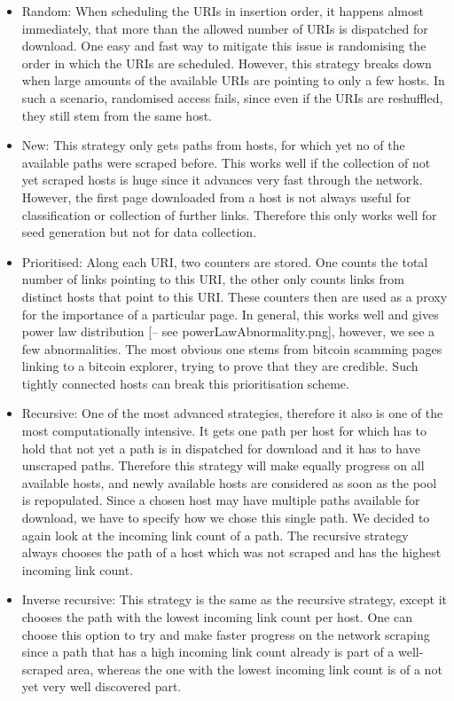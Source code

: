 \documentclass[USenglish,oneside,twocolumn]{article}
\begin{document}
\begin{itemize}
  \item Random: When scheduling the URIs in insertion order, it happens almost immediately, that more than the allowed number of URIs is dispatched for download. One easy and fast way to mitigate this issue is randomising the order in which the URIs are scheduled. However, this strategy breaks down when large amounts of the available URIs are pointing to only a few hosts. In such a scenario, randomised access fails, since even if the URIs are reshuffled, they still stem from the same host.
  \item New: This strategy only gets paths from hosts, for which yet no of the available paths were scraped before. This works well if the collection of not yet scraped hosts is huge since it advances very fast through the network. However, the first page downloaded from a host is not always useful for classification or collection of further links. Therefore this only works well for seed generation but not for data collection.
  \item Prioritised: Along each URI, two counters are stored. One counts the total number of links pointing to this URI, the other only counts links from distinct hosts that point to this URI. These counters then are used as a proxy for the importance of a particular page. In general, this works well and gives power law distribution [-- see powerLawAbnormality.png], however, we see a few abnormalities. The most obvious one stems from bitcoin scamming pages linking to a bitcoin explorer, trying to prove that they are credible. Such tightly connected hosts can break this prioritisation scheme.
  \item Recursive: One of the most advanced strategies, therefore it also is one of the most computationally intensive. It gets one path per host for which has to hold that not yet a path is in dispatched for download and it has to have unscraped paths. Therefore this strategy will make equally progress on all available hosts, and newly available hosts are considered as soon as the pool is repopulated. Since a chosen host may have multiple paths available for download, we have to specify how we chose this single path. We decided to again look at the incoming link count of a path. The recursive strategy always chooses the path of a host which was not scraped and has the highest incoming link count.
  \item Inverse recursive: This strategy is the same as the recursive strategy, except it chooses the path with the lowest incoming link count per host. One can choose this option to try and make faster progress on the network scraping since a path that has a high incoming link count already is part of a well-scraped area, whereas the one with the lowest incoming link count is of a not yet very well discovered part.

\end{itemize}
\end{document}
